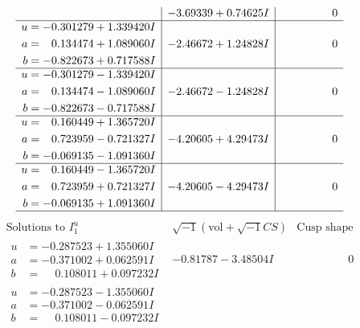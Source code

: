 \documentclass[1p]{elsarticle_modified}
\theoremstyle{definition}
\newcommand{\I}{\sqrt{-1}}
\begin{document}
$$\begin{array}{c|c|c}
 & -3.69339 + 0.74625 I & \phantom{-0.000000 } 0 \\ \hline\begin{aligned}
u &= -0.301279 + 1.339420 I \\
a &= \phantom{-}0.134474 + 1.089060 I \\
b &= -0.822673 + 0.717588 I\end{aligned}
 & -2.46672 + 1.24828 I & \phantom{-0.000000 } 0 \\ \hline\begin{aligned}
u &= -0.301279 - 1.339420 I \\
a &= \phantom{-}0.134474 - 1.089060 I \\
b &= -0.822673 - 0.717588 I\end{aligned}
 & -2.46672 - 1.24828 I & \phantom{-0.000000 } 0 \\ \hline\begin{aligned}
u &= \phantom{-}0.160449 + 1.365720 I \\
a &= \phantom{-}0.723959 - 0.721327 I \\
b &= -0.069135 - 1.091360 I\end{aligned}
 & -4.20605 + 4.29473 I & \phantom{-0.000000 } 0 \\ \hline\begin{aligned}
u &= \phantom{-}0.160449 - 1.365720 I \\
a &= \phantom{-}0.723959 + 0.721327 I \\
b &= -0.069135 + 1.091360 I\end{aligned}
 & -4.20605 - 4.29473 I & \phantom{-0.000000 } 0\\
 \hline 
 \end{array}$$\newpage$$\begin{array}{c|c|c}  
\text{Solutions to }I^u_{1}& \I (\text{vol} + \sqrt{-1}CS) & \text{Cusp shape}\\
 \hline 
\begin{aligned}
u &= -0.287523 + 1.355060 I \\
a &= -0.371002 + 0.062591 I \\
b &= \phantom{-}0.108011 + 0.097232 I\end{aligned}
 & -0.81787 - 3.48504 I & \phantom{-0.000000 } 0 \\ \hline\begin{aligned}
u &= -0.287523 - 1.355060 I \\
a &= -0.371002 - 0.062591 I \\
b &= \phantom{-}0.108011 - 0.097232 I\end{aligned}

\end{array}$$
\end{document}
